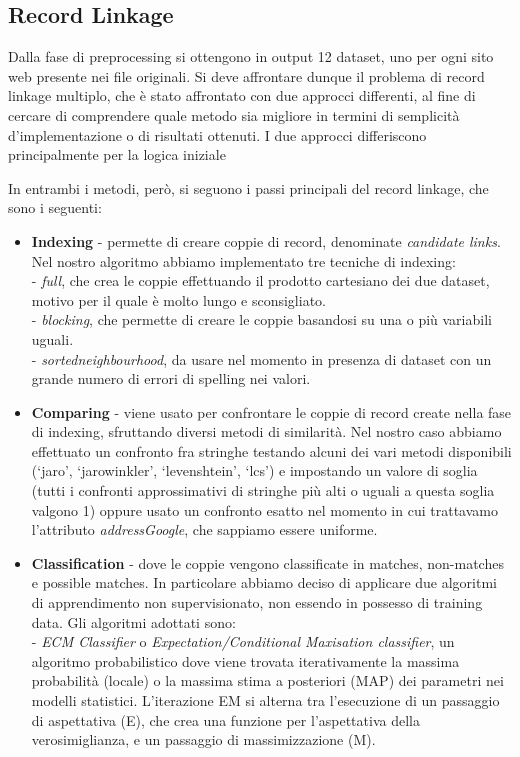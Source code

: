 \documentclass[a4paper,12pt]{article}
\begin{document}
\newpage
\subsection{Record Linkage}
Dalla fase di preprocessing si ottengono in output 12 dataset, uno per ogni sito web presente nei file originali. Si deve affrontare dunque il problema di record linkage multiplo, che è stato affrontato con due approcci differenti, al fine di cercare di comprendere quale metodo sia migliore in termini di semplicità d'implementazione o di risultati ottenuti. I due approcci differiscono principalmente per la logica iniziale %

In entrambi i metodi, però, si seguono i passi principali del record linkage, che sono i seguenti:
\begin{itemize}
\item \textbf{Indexing} - permette di creare coppie di record, denominate \textit{candidate links}. Nel nostro algoritmo abbiamo implementato tre tecniche di indexing: \\
- \textit{full}, che crea le coppie effettuando il prodotto cartesiano dei due dataset, motivo per il quale è molto lungo e sconsigliato. \\
- \textit{blocking}, che permette di creare le coppie basandosi su una o più variabili uguali. \\
- \textit{sortedneighbourhood}, da usare nel momento in presenza di dataset con un grande numero di errori di spelling nei valori.
\item \textbf{Comparing} - viene usato per confrontare le coppie di record create nella fase di indexing, sfruttando diversi metodi di similarità. Nel nostro caso abbiamo effettuato un confronto fra stringhe testando alcuni dei vari metodi disponibili (‘jaro’, ‘jarowinkler’, ‘levenshtein’, ‘lcs’) e impostando un valore di soglia (tutti i confronti approssimativi di stringhe più alti o uguali a questa soglia valgono 1) oppure usato un confronto esatto nel momento in cui trattavamo l'attributo \textit{addressGoogle}, che sappiamo essere uniforme.
\item \textbf{Classification} - dove le coppie vengono classificate in matches, non-matches e possible matches. In particolare abbiamo deciso di applicare due algoritmi di apprendimento non supervisionato, non essendo in possesso di training data. Gli algoritmi adottati sono: \\
- \textit{ECM Classifier} o \textit{Expectation/Conditional Maxisation classifier}, un algoritmo probabilistico dove viene trovata iterativamente la massima probabilità (locale) o la massima stima a posteriori (MAP) dei parametri nei modelli statistici. L'iterazione EM si alterna tra l'esecuzione di un passaggio di aspettativa (E), che crea una funzione per l'aspettativa della verosimiglianza, e un passaggio di massimizzazione (M). \\

\end{itemize}
\end{document}
